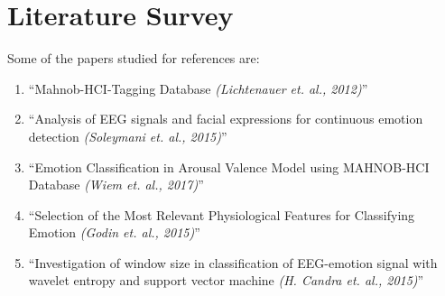 
\chapter{Literature Survey} %

\label{Chapter2} %


Some of the papers studied for references are:
\begin{enumerate}
\item ``Mahnob-HCI-Tagging Database \emph{(Lichtenauer et. al., 2012)}''\cite{mahnobDataset}
\item ``Analysis of EEG signals and facial expressions for continuous emotion detection \emph{(Soleymani et. al., 2015)}''\cite{mahnobEmo}
\item ``Emotion Classification in Arousal Valence Model using MAHNOB-HCI Database \emph{(Wiem et. al., 2017)}''\cite{wiem}
\item ``Selection of the Most Relevant Physiological Features for Classifying Emotion \emph{(Godin et. al., 2015)}''\cite{sel}
\item ``Investigation of window size in classification of EEG-emotion signal with wavelet entropy and support vector machine \emph{(H. {Candra} et. al., 2015)}''\cite{window}
\end{enumerate}

